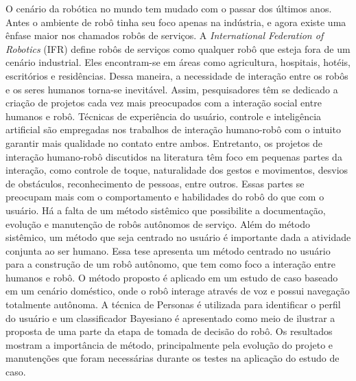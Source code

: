 
\begin{resumo}
O cenário da robótica no mundo tem mudado com o passar dos últimos anos. Antes o ambiente de robô tinha seu foco apenas na indústria, e agora existe uma ênfase maior nos chamados robôs de serviços. A \textit{International Federation of Robotics} (IFR) define robôs de serviços como qualquer robô que esteja fora de um cenário industrial. Eles encontram-se em áreas como agricultura, hospitais, hotéis, escritórios e residências. Dessa maneira, a necessidade de interação entre os robôs e os seres humanos torna-se inevitável. Assim, pesquisadores têm se dedicado a criação de projetos cada vez mais preocupados com a interação social entre humanos e robô. Técnicas de experiência do usuário, controle e inteligência artificial são empregadas nos trabalhos de interação humano-robô com o intuito garantir mais qualidade no contato entre ambos. Entretanto, os projetos de interação humano-robô discutidos na literatura têm foco em pequenas partes da interação, como controle de toque, naturalidade dos gestos e movimentos, desvios de obstáculos, reconhecimento de pessoas, entre outros. Essas partes se preocupam mais com o comportamento e habilidades do robô do que com o usuário. Há a falta de um método sistêmico que possibilite a documentação, evolução e manutenção de robôs autônomos de serviço. Além do método sistêmico, um método que seja centrado no usuário é importante dada a atividade conjunta ao ser humano. Essa tese apresenta um método centrado no usuário para a construção de um robô autônomo, que tem como foco a interação entre humanos e robô. O método proposto é aplicado em um estudo de caso baseado em um cenário doméstico, onde o robô interage através de voz e possui navegação totalmente autônoma. A técnica de Personas é utilizada para identificar o perfil do usuário e um classificador Bayesiano é apresentado como meio de ilustrar a proposta de uma parte da etapa de tomada de decisão do robô. Os resultados mostram a importância de método, principalmente pela evolução do projeto e manutenções que foram necessárias durante os testes na aplicação do estudo de caso.


\end{resumo}
